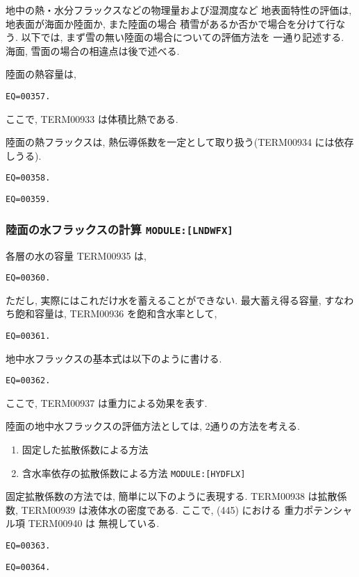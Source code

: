 地中の熱・水分フラックスなどの物理量および湿潤度など
地表面特性の評価は, 地表面が海面か陸面か, また陸面の場合
積雪があるか否かで場合を分けて行なう. 
以下では, まず雪の無い陸面の場合についての評価方法を
一通り記述する. 海面, 雪面の場合の相違点は後で述べる. 

陸面の熱容量は,
\begin{verbatim}
EQ=00357.
\end{verbatim}
ここで, TERM00933 は体積比熱である.

陸面の熱フラックスは, 熱伝導係数を一定として取り扱う(TERM00934 には依存しうる).
\begin{verbatim}
EQ=00358.
\end{verbatim}
\begin{verbatim}
EQ=00359.
\end{verbatim}

\subsubsection{陸面の水フラックスの計算 \texttt{MODULE:[LNDWFX]}}

各層の水の容量 TERM00935 は, 
\begin{verbatim}
EQ=00360.
\end{verbatim}
ただし, 実際にはこれだけ水を蓄えることができない.
最大蓄え得る容量, すなわち飽和容量は, TERM00936 を飽和含水率として,
\begin{verbatim}
EQ=00361.
\end{verbatim}

地中水フラックスの基本式は以下のように書ける. 
\begin{verbatim}
EQ=00362.
\end{verbatim}
ここで, TERM00937 は重力による効果を表す. 

陸面の地中水フラックスの評価方法としては, 2通りの方法を考える.
\begin{enumerate}
\item 固定した拡散係数による方法
\item 含水率依存の拡散係数による方法 \texttt{MODULE:[HYDFLX]}
\end{enumerate}

固定拡散係数の方法では, 簡単に以下のように表現する.
TERM00938 は拡散係数, TERM00939 は液体水の密度である.
ここで, (445) における 重力ポテンシャル項 TERM00940 は
無視している. 
\begin{verbatim}
EQ=00363.
\end{verbatim}
\begin{verbatim}
EQ=00364.
\end{verbatim}

